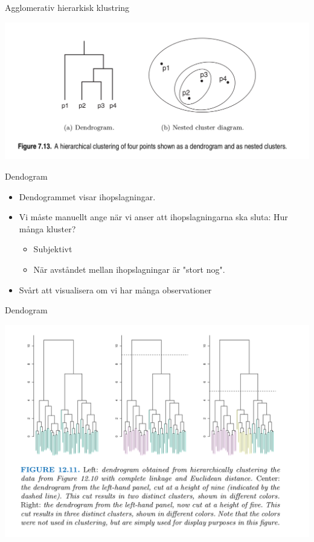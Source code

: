 \documentclass[10pt,english]{beamer}
\begin{document}
\begin{frame}{Agglomerativ hierarkisk klustring}

    \includegraphics[width = \textwidth]{figs/dendogram2.png}
    
\end{frame}

\begin{frame}{Dendogram}

    \begin{itemize}
        \item Dendogrammet visar  ihopslagningar.
        \item Vi måste manuellt ange när vi anser att ihopslagningarna ska sluta: Hur många kluster?
        \begin{itemize}
            \item Subjektivt
            \item När avståndet mellan ihopslagningar är "stort nog".
        \end{itemize}
        \item Svårt att visualisera om vi har många observationer
    \end{itemize}
    
\end{frame}

\begin{frame}{Dendogram}

    \includegraphics[width=\textwidth]{figs/dendogram3.png}
    
\end{frame}
\end{document}
